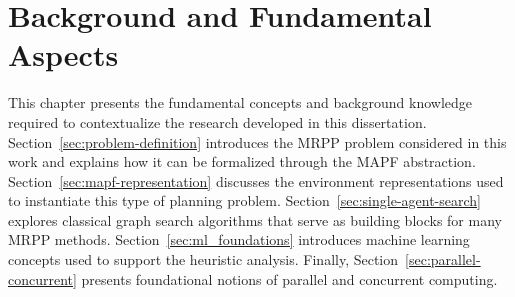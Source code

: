 \chapter{Background and Fundamental Aspects}
\label{chap:ch2}
\hspace{\parindent}
This chapter presents the fundamental concepts and background knowledge required to contextualize
the research developed in this dissertation. Section~\ref{sec:problem-definition} introduces the
MRPP problem considered in this work and explains how it can be formalized through the MAPF
abstraction. Section~\ref{sec:mapf-representation} discusses the environment representations used
to instantiate this type of planning problem. Section~\ref{sec:single-agent-search} explores
classical graph search algorithms that serve as building blocks for many MRPP methods.
Section~\ref{sec:ml_foundations} introduces machine learning concepts used to support the
heuristic analysis. Finally, Section~\ref{sec:parallel-concurrent} presents foundational notions of
parallel and concurrent computing.









